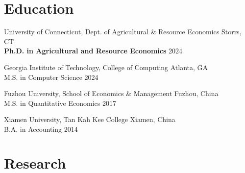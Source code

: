 \documentclass[10.5pt,letterpaper]{article}
\renewenvironment{itemize}{
	\begin{list}{}{
			\setlength{\leftmargin}{1.5em}
		}
	}{
	\end{list}
}
\begin{document}
	\section*{\textbf{Education}}
	\begin{itemize}
		\item[-] University of Connecticut, Dept. of Agricultural \& Resource Economics \hfill Storrs, CT \\
		\textbf{Ph.D. in Agricultural and Resource Economics} \hfill 2024
		
		\item[-] Georgia Institute of Technology, College of Computing \hfill Atlanta, GA \\
		M.S. in Computer Science \hfill 2024
		
		\item[-] Fuzhou University, School of Economics \& Management \hfill Fuzhou, China \\
		M.S. in Quantitative Economics \hfill 2017
		
		\item[-] Xiamen University, Tan Kah Kee College \hfill Xiamen, China \\
		B.A. in Accounting \hfill 2014
	\end{itemize}
	
	\section*{\textbf{Research}}
 
\end{document}
